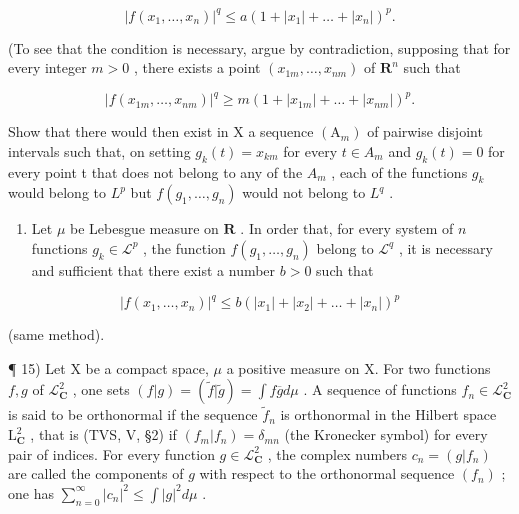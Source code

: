 \[
\left| f \left(x _ {1}, \dots , x _ {n}\right) \right| ^ {q} \leqslant a \left(1 + \left| x _ {1} \right| + \dots + \left| x _ {n} \right|\right) ^ {p}.
\]

(To see that the condition is necessary, argue by contradiction, supposing that for every integer \(m > 0\) , there exists a point \((x_{1m},\ldots ,x_{nm})\) of \(\mathbf{R}^n\) such that

\[
| f (x _ {1 m}, \dots , x _ {n m}) | ^ {q} \geqslant m (1 + | x _ {1 m} | + \dots + | x _ {n m} |) ^ {p}.
\]

Show that there would then exist in X a sequence \((\mathrm{A}_{m})\) of pairwise disjoint intervals such that, on setting \(g_{k}(t)=x_{km}\) for every \(t\in A_{m}\) and \(g_{k}(t)=0\) for every point t that does not belong to any of the \(A_{m}\) , each of the functions \(g_{k}\) would belong to \(L^{p}\) but \(f(g_{1},\ldots,g_{n})\) would not belong to \(L^{q}\) .

\begin{enumerate}
\def\labelenumi{\alph{enumi})}
\setcounter{enumi}{1}
\tightlist
\item
  Let \(\mu\) be Lebesgue measure on \(\mathbf{R}\) . In order that, for every system of \(n\) functions \(g_k \in \mathcal{L}^p\) , the function \(f(g_1, \ldots, g_n)\) belong to \(\mathcal{L}^q\) , it is necessary and sufficient that there exist a number \(b > 0\) such that
\end{enumerate}

\[
\left| f \left(x _ {1}, \dots , x _ {n}\right) \right| ^ {q} \leqslant b \left(\left| x _ {1} \right| + \left| x _ {2} \right| + \dots + \left| x _ {n} \right|\right) ^ {p}
\]

(same method).

¶ 15) Let X be a compact space, \(\mu\) a positive measure on X. For two functions \(f, g\) of \(\mathcal{L}_{\mathbf{C}}^{2}\) , one sets \((f|g) = (\widetilde{f}|\widetilde{g}) = \int f\overline{g} d\mu\) . A sequence of functions \(f_{n} \in \mathcal{L}_{\mathbf{C}}^{2}\) is said to be orthonormal if the sequence \(\widetilde{f}_{n}\) is orthonormal in the Hilbert space \(\mathrm{L}_{\mathbf{C}}^{2}\) , that is (TVS, V, §2) if \((f_{m}|f_{n}) = \delta_{mn}\) (the Kronecker symbol) for every pair of indices. For every function \(g \in \mathcal{L}_{\mathbf{C}}^{2}\) , the complex numbers \(c_{n} = (g|f_{n})\) are called the components of \(g\) with respect to the orthonormal sequence \((f_{n})\) ; one has \(\sum_{n=0}^{\infty} |c_{n}|^{2} \leqslant \int |g|^{2} d\mu\) .

